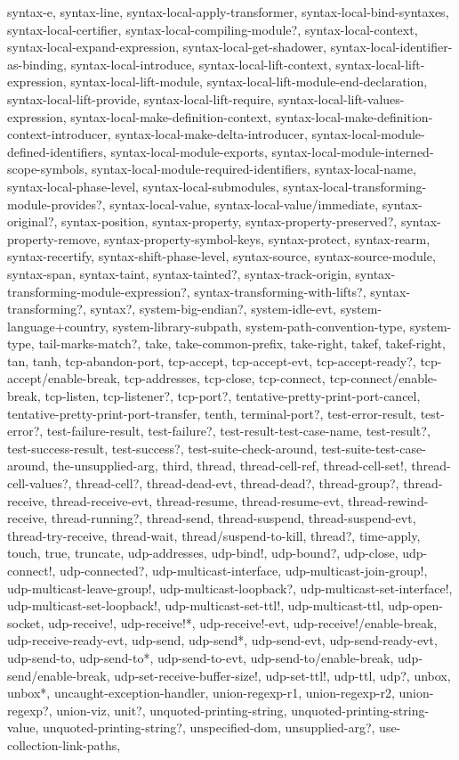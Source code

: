 {{syntax-e, syntax-line, syntax-local-apply-transformer, syntax-local-bind-syntaxes, syntax-local-certifier, syntax-local-compiling-module?, syntax-local-context, syntax-local-expand-expression, syntax-local-get-shadower, syntax-local-identifier-as-binding, syntax-local-introduce, syntax-local-lift-context, syntax-local-lift-expression, syntax-local-lift-module, syntax-local-lift-module-end-declaration, syntax-local-lift-provide, syntax-local-lift-require, syntax-local-lift-values-expression, syntax-local-make-definition-context, syntax-local-make-definition-context-introducer, syntax-local-make-delta-introducer, syntax-local-module-defined-identifiers, syntax-local-module-exports, syntax-local-module-interned-scope-symbols, syntax-local-module-required-identifiers, syntax-local-name, syntax-local-phase-level, syntax-local-submodules, syntax-local-transforming-module-provides?, syntax-local-value, syntax-local-value/immediate, syntax-original?, syntax-position, syntax-property, syntax-property-preserved?, syntax-property-remove, syntax-property-symbol-keys, syntax-protect, syntax-rearm, syntax-recertify, syntax-shift-phase-level, syntax-source, syntax-source-module, syntax-span, syntax-taint, syntax-tainted?, syntax-track-origin, syntax-transforming-module-expression?, syntax-transforming-with-lifts?, syntax-transforming?, syntax?, system-big-endian?, system-idle-evt, system-language+country, system-library-subpath, system-path-convention-type, system-type, tail-marks-match?, take, take-common-prefix, take-right, takef, takef-right, tan, tanh, tcp-abandon-port, tcp-accept, tcp-accept-evt, tcp-accept-ready?, tcp-accept/enable-break, tcp-addresses, tcp-close, tcp-connect, tcp-connect/enable-break, tcp-listen, tcp-listener?, tcp-port?, tentative-pretty-print-port-cancel, tentative-pretty-print-port-transfer, tenth, terminal-port?, test-error-result, test-error?, test-failure-result, test-failure?, test-result-test-case-name, test-result?, test-success-result, test-success?, test-suite-check-around, test-suite-test-case-around, the-unsupplied-arg, third, thread, thread-cell-ref, thread-cell-set!, thread-cell-values?, thread-cell?, thread-dead-evt, thread-dead?, thread-group?, thread-receive, thread-receive-evt, thread-resume, thread-resume-evt, thread-rewind-receive, thread-running?, thread-send, thread-suspend, thread-suspend-evt, thread-try-receive, thread-wait, thread/suspend-to-kill, thread?, time-apply, touch, true, truncate, udp-addresses, udp-bind!, udp-bound?, udp-close, udp-connect!, udp-connected?, udp-multicast-interface, udp-multicast-join-group!, udp-multicast-leave-group!, udp-multicast-loopback?, udp-multicast-set-interface!, udp-multicast-set-loopback!, udp-multicast-set-ttl!, udp-multicast-ttl, udp-open-socket, udp-receive!, udp-receive!*, udp-receive!-evt, udp-receive!/enable-break, udp-receive-ready-evt, udp-send, udp-send*, udp-send-evt, udp-send-ready-evt, udp-send-to, udp-send-to*, udp-send-to-evt, udp-send-to/enable-break, udp-send/enable-break, udp-set-receive-buffer-size!, udp-set-ttl!, udp-ttl, udp?, unbox, unbox*, uncaught-exception-handler, union-regexp-r1, union-regexp-r2, union-regexp?, union-viz, unit?, unquoted-printing-string, unquoted-printing-string-value, unquoted-printing-string?, unspecified-dom, unsupplied-arg?, use-collection-link-paths, }}
